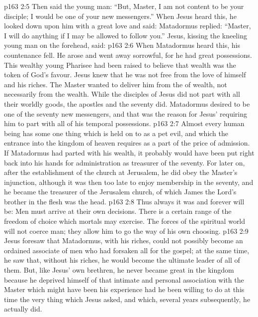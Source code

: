 \vs p163 2:5 Then said the young man: “But, Master, I am not content to be your disciple; I would be one of your new messengers.” When Jesus heard this, he looked down upon him with a great love and said:  Matadormus replied: “Master, I will do anything if I may be allowed to follow you.” Jesus, kissing the kneeling young man on the forehead, said: 
\vs p163 2:6 When Matadormus heard this, his countenance fell. He arose and went away sorrowful, for he had great possessions. This wealthy young Pharisee had been raised to believe that wealth was the token of God’s favour. Jesus knew that he was not free from the love of himself and his riches. The Master wanted to deliver him from the  of wealth, not necessarily from the wealth. While the disciples of Jesus did not part with all their worldly goods, the apostles and the seventy did. Matadormus desired to be one of the seventy new messengers, and that was the reason for Jesus’ requiring him to part with all of his temporal possessions.
\vs p163 2:7 \pc Almost every human being has some one thing which is held on to as a pet evil, and which the entrance into the kingdom of heaven requires as a part of the price of admission. If Matadormus had parted with his wealth, it probably would have been put right back into his hands for administration as treasurer of the seventy. For later on, after the establishment of the church at Jerusalem, he did obey the Master’s injunction, although it was then too late to enjoy membership in the seventy, and he became the treasurer of the Jerusalem church, of which James the Lord’s brother in the flesh was the head.
\vs p163 2:8 Thus always it was and forever will be: Men must arrive at their own decisions. There is a certain range of the freedom of choice which mortals may exercise. The forces of the spiritual world will not coerce man; they allow him to go the way of his own choosing.
\vs p163 2:9 Jesus foresaw that Matadormus, with his riches, could not possibly become an ordained associate of men who had forsaken all for the gospel; at the same time, he saw that, without his riches, he would become the ultimate leader of all of them. But, like Jesus’ own brethren, he never became great in the kingdom because he deprived himself of that intimate and personal association with the Master which might have been his experience had he been willing to do at this time the very thing which Jesus asked, and which, several years subsequently, he actually did.
